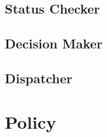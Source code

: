 \documentclass[11pt]{article}
\begin{document}
\subsection{Status Checker}

\subsection{Decision Maker}

\subsection{Dispatcher}

\section{Policy}



\end{document}
